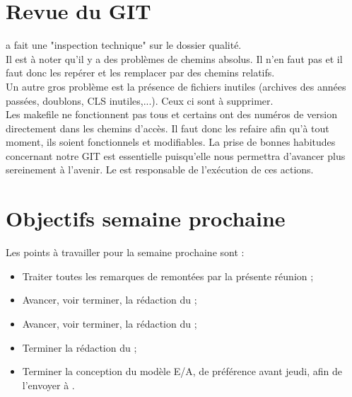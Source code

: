 \documentclass [a4paper] {article}
\begin{document}
\section{Revue du GIT}

\nomTuteurPedago{} a fait une "inspection technique" sur le dossier qualité.
\\
Il est à noter qu'il y a des problèmes de chemins absolus. Il n'en faut pas et il faut donc les repérer et les remplacer par des chemins relatifs.
\\
Un autre gros problème est la présence de fichiers inutiles (archives des années passées, doublons, CLS inutiles,...). Ceux ci sont à supprimer.
\\
Les makefile ne fonctionnent pas tous et certains ont des numéros de version directement dans les chemins d'accès. Il faut donc les refaire afin qu'à tout moment, ils soient fonctionnels et modifiables. La prise de bonnes habitudes concernant notre GIT est essentielle puisqu'elle nous permettra d'avancer plus sereinement à l'avenir. Le \RD{}
est responsable de l'exécution de ces actions.

\section{Objectifs semaine prochaine}
Les points à travailler pour la semaine prochaine sont :
\begin{itemize}
\item Traiter toutes les remarques de \nomTuteurPedago{} remontées par la présente réunion ;
\item Avancer, voir terminer, la rédaction du \PTV{} ;
\item Avancer, voir terminer, la rédaction du \DSI{} ;
\item Terminer la rédaction du \DSE{} ;
\item Terminer la conception du modèle E/A, de préférence avant jeudi, afin de l'envoyer à \nomTuteurPedago{}.
\end{itemize}


\newpage
\end{document}
